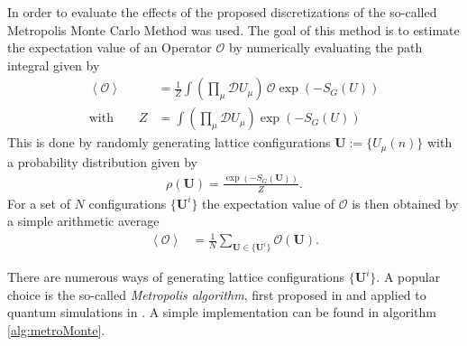 In order to evaluate the effects of the proposed discretizations of \SUTwo the so-called Metropolis Monte Carlo Method was used. The goal of this method is to estimate the expectation value of an Operator $\mathcal{O}$ by numerically evaluating the path integral given by
\begin{align*}
 \left\langle \mathcal{O} \right\rangle & = \frac{1}{Z}\int \left( \prod_\mu \mathcal{D} U_\mu \right) \, \mathcal{O} \exp \left( - S_G(U)\right) \\
 \textrm{with} \qquad Z                 & = \int \left( \prod_\mu \mathcal{D} U_\mu \right) \exp \left( - S_G(U)\right)
\end{align*}
This is done by randomly generating lattice configurations $\boldsymbol{U} := \{ U_\mu(n) \}$ with a probability distribution given by
\begin{align}
 \rho ( \boldsymbol{U} ) = \frac{\exp\left(  -S_G(\boldsymbol{U}) \right)}{Z} \textrm{.}
 \label{eq:metroDist}
\end{align}
For a set of $N$ configurations $\{ \boldsymbol{U}^i \}$ the expectation value of $\mathcal{O}$ is then obtained by a simple arithmetic average
\begin{align*}
 \left\langle \mathcal{O} \right\rangle & = \frac{1}{N} \sum_{\boldsymbol{U} \in \{ \boldsymbol{U}^i \}} \mathcal{O} (\boldsymbol{U}) \textrm{.}
\end{align*}

There are numerous ways of generating lattice configurations $\{ \boldsymbol{U}^i \}$. A popular choice is the so-called \emph{Metropolis algorithm}, first proposed in \cite{metropolis:1953} and applied to quantum simulations in \cite{Creutz:1981}. A simple implementation can be found in algorithm \ref{alg:metroMonte}.

